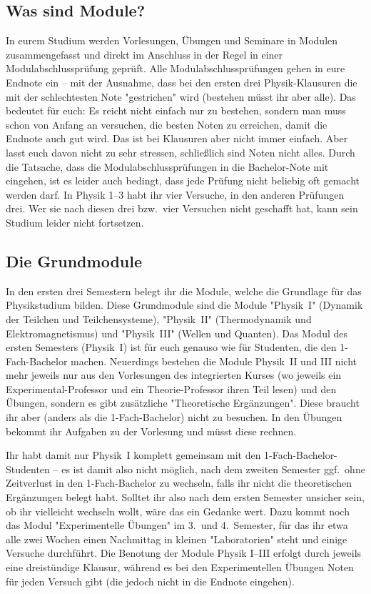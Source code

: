 \begin{multicols*}{2}
\subsection*{Was sind Module?}
In eurem Studium werden Vorlesungen, Übungen und Seminare in Modulen zusammengefasst und direkt im Anschluss in der Regel in einer Modulabschlussprüfung geprüft. Alle Modulabschlussprüfungen gehen in eure Endnote ein -- mit der Ausnahme, dass bei den ersten drei Physik-Klausuren die mit der schlechtesten Note "gestrichen" wird (bestehen müsst ihr aber alle). Das bedeutet für euch: Es reicht nicht einfach nur zu bestehen, sondern man muss schon von Anfang an versuchen, die besten Noten zu erreichen, damit die Endnote auch gut wird. Das ist bei Klausuren aber nicht immer einfach. Aber lasst euch davon nicht zu sehr stressen, schließlich sind Noten nicht alles. Durch die Tatsache, dass die Modulabschlussprüfungen in die Bachelor-Note mit eingehen, ist es leider auch bedingt, dass jede Prüfung nicht beliebig oft gemacht werden darf. In Physik 1--3 habt ihr vier Versuche, in den anderen Prüfungen drei. Wer sie nach diesen drei bzw.\ vier Versuchen nicht geschafft hat, kann sein Studium leider nicht fortsetzen.

\subsection*{Die Grundmodule}
In den ersten drei Semestern belegt ihr die Module, welche die Grundlage für das Physikstudium bilden. Diese Grundmodule sind die Module "Physik~I" (Dynamik der Teilchen und Teilchensysteme), "Physik~II" (Thermodynamik und Elektromagnetismus) und "Physik~III" (Wellen und Quanten). Das Modul des ersten Semesters (Physik~I) ist für euch genauso wie für Studenten, die den 1-Fach-Bachelor machen. Neuerdings bestehen die Module Physik~II und III nicht mehr jeweils nur aus den Vorlesungen des integrierten Kurses (wo jeweils ein Experimental-Professor und ein Theorie-Professor ihren Teil lesen) und den Übungen, sondern es gibt zusätzliche "Theoretische Ergänzungen". Diese braucht ihr aber (anders als die 1-Fach-Bachelor) nicht zu besuchen. In den Übungen bekommt ihr Aufgaben zu der Vorlesung und müsst diese rechnen.

Ihr habt damit nur Physik~I komplett gemeinsam mit den 1-Fach-Bachelor-Studenten -- es ist damit also nicht möglich, nach dem zweiten Semester ggf.\ ohne Zeitverlust in den 1-Fach-Bachelor zu wechseln, falls ihr nicht die theoretischen Ergänzungen belegt habt. Solltet ihr also nach dem ersten Semester unsicher sein, ob ihr vielleicht wechseln wollt, wäre das ein Gedanke wert. Dazu kommt noch das Modul "Experimentelle Übungen" im 3.\ und 4.~Semester, für das ihr etwa alle zwei Wochen einen Nachmittag in kleinen "Laboratorien" steht und einige Versuche durchführt. Die Benotung der Module Physik I--III erfolgt durch jeweils eine dreistündige Klausur, während es bei den Experimentellen Übungen Noten für jeden Versuch gibt (die jedoch nicht in die Endnote eingehen).


\end{multicols*}
